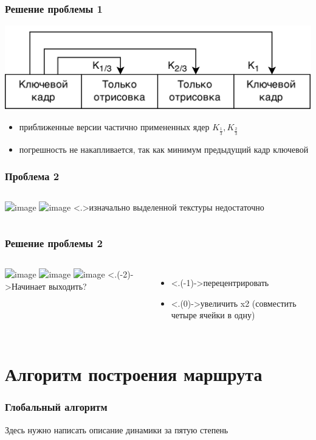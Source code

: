 \documentclass{beamer} %
\theoremstyle{definition} %
\begin{document}
\begin{frame}
\frametitle{Решение проблемы 1}
\includegraphics[width=\textwidth]{pics/keyframe.png} 
\begin{itemize}
  \item{приближенные версии частично примененных ядер $K_{\frac{1}{3}}, K_{\frac{2}{3}}$}
  \item{погрешность не накапливается, так как минимум предыдущий кадр ключевой}
\end{itemize}
\end{frame}

\begin{frame}
  \frametitle{Проблема 2}
\begin{columns}
\includegraphics<+>[width=\textwidth]{pics/pic07-1.png}
\includegraphics<+>[width=\textwidth]{pics/pic07-2.png}
\only<.>{изначально выделенной текстуры недостаточно}
\end{columns}
\end{frame}

\begin{frame}
  \frametitle{Решение проблемы 2}
\begin{columns}
\includegraphics<+>[width=\textwidth]{pics/pic07-3.png}
\includegraphics<+>[width=\textwidth]{pics/pic07-4.png}
\includegraphics<+>[width=\textwidth]{pics/pic07-5.png}
\only<.(-2)->{Начинает выходить?}
\begin{itemize}
  \item<.(-1)->{перецентрировать}
  \item<.(0)->{увеличить x2 (совместить четыре ячейки в одну)}
\end{itemize}
\end{columns}
\end{frame}

\section{Алгоритм построения маршрута}
\begin{frame}
\frametitle{Глобальный алгоритм}
Здесь нужно написать описание динамики за пятую степень
\end{frame}
\end{document}
